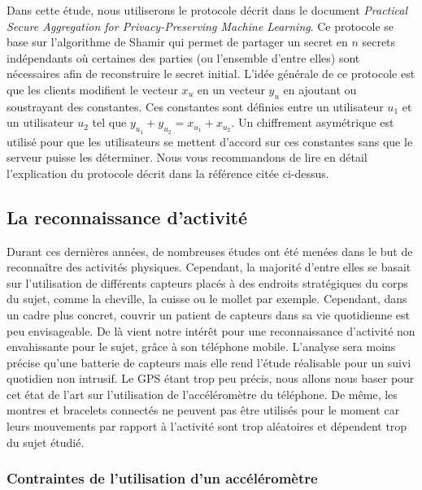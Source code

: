 \documentclass{article}
\begin{document}
Dans cette étude, nous utiliserons le protocole décrit dans le document \textit{Practical Secure Aggregation
for Privacy-Preserving Machine Learning}\cite{BonawitzPracticalSecureAggregation2017}. Ce protocole se base sur l'algorithme de Shamir\cite{ShamirHowShareSecret1979} qui permet de partager un secret en $n$ secrets indépendants où certaines des parties (ou l'ensemble d'entre elles) sont nécessaires afin de reconstruire le secret initial. L'idée générale de ce protocole est que les clients modifient le vecteur $x_{u}$ en un vecteur $y_{u}$ en ajoutant ou soustrayant des constantes. Ces constantes sont définies entre un utilisateur $u_{1}$ et un utilisateur $u_{2}$ tel que $y_{u_{1}} + y_{u_{2}} = x_{u_{1}} + x_{u_{2}}$. Un chiffrement asymétrique est utilisé pour que les utilisateurs se mettent d'accord sur ces constantes sans que le serveur puisse les déterminer. Nous vous recommandons de lire en détail l'explication du protocole décrit dans la référence citée ci-dessus.

\subsection{La reconnaissance d'activité}

Durant ces dernières années, de nombreuses études ont été menées dans le but de reconnaître des activités physiques. Cependant, la majorité d'entre elles se basait sur l'utilisation de différents capteurs placés à des endroits stratégiques du corps du sujet, comme la cheville, la cuisse ou le mollet par exemple.  \cite{BaoActivityRecognitionUserAnnotated2004}
Cependant, dans un cadre plus concret, couvrir un patient de capteurs dans sa vie quotidienne est peu envisageable. De là vient notre intérêt pour une reconnaissance d'activité non envahissante pour le sujet, grâce à son téléphone mobile. L'analyse sera moins précise qu'une batterie de capteurs mais elle rend l'étude réalisable pour un suivi quotidien non intrusif. Le GPS étant trop peu précis, nous allons nous baser pour cet état de l'art sur l'utilisation de l'accéléromètre du téléphone. \cite{SunActivityRecognitionAccelerometer2010a} De même, les montres et bracelets connectés ne peuvent pas être utilisés pour le moment car leurs mouvements par rapport à l'activité sont trop aléatoires et dépendent trop du sujet étudié.

\subsubsection{Contraintes de l'utilisation d'un accéléromètre}
\end{document}
